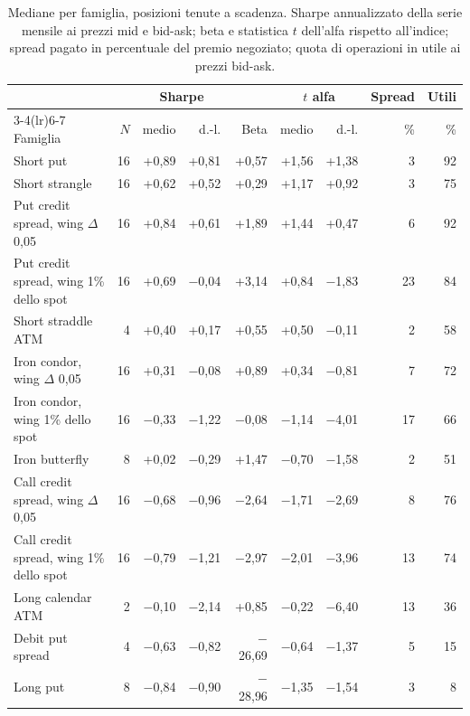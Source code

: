 \documentclass[11pt,a4paper]{article}
\begin{document}
\begin{table}[ht]\centering\small
\caption{Mediane per famiglia, posizioni tenute a scadenza. Sharpe annualizzato della serie mensile ai prezzi mid e bid-ask; beta e statistica $t$ dell'alfa rispetto all'indice; spread pagato in percentuale del premio negoziato; quota di operazioni in utile ai prezzi bid-ask.}\label{tab:fam}
\begin{tabular}{lrrrrrrrr}\toprule
 & & \multicolumn{2}{c}{Sharpe} & & \multicolumn{2}{c}{$t$ alfa} & Spread & Utili \\ \cmidrule(lr){3-4}\cmidrule(lr){6-7}
Famiglia & $N$ & medio & d.-l. & Beta & medio & d.-l. & \% & \% \\ \midrule
Short put & 16 & +0{,}89 & +0{,}81 & +0{,}57 & +1{,}56 & +1{,}38 & 3 & 92 \\
Short strangle & 16 & +0{,}62 & +0{,}52 & +0{,}29 & +1{,}17 & +0{,}92 & 3 & 75 \\
Put credit spread, wing $\Delta$ 0{,}05 & 16 & +0{,}84 & +0{,}61 & +1{,}89 & +1{,}44 & +0{,}47 & 6 & 92 \\
Put credit spread, wing 1\% dello spot & 16 & +0{,}69 & $-$0{,}04 & +3{,}14 & +0{,}84 & $-$1{,}83 & 23 & 84 \\
Short straddle ATM & 4 & +0{,}40 & +0{,}17 & +0{,}55 & +0{,}50 & $-$0{,}11 & 2 & 58 \\
Iron condor, wing $\Delta$ 0{,}05 & 16 & +0{,}31 & $-$0{,}08 & +0{,}89 & +0{,}34 & $-$0{,}81 & 7 & 72 \\
Iron condor, wing 1\% dello spot & 16 & $-$0{,}33 & $-$1{,}22 & $-$0{,}08 & $-$1{,}14 & $-$4{,}01 & 17 & 66 \\
Iron butterfly & 8 & +0{,}02 & $-$0{,}29 & +1{,}47 & $-$0{,}70 & $-$1{,}58 & 2 & 51 \\
Call credit spread, wing $\Delta$ 0{,}05 & 16 & $-$0{,}68 & $-$0{,}96 & $-$2{,}64 & $-$1{,}71 & $-$2{,}69 & 8 & 76 \\
Call credit spread, wing 1\% dello spot & 16 & $-$0{,}79 & $-$1{,}21 & $-$2{,}97 & $-$2{,}01 & $-$3{,}96 & 13 & 74 \\
Long calendar ATM & 2 & $-$0{,}10 & $-$2{,}14 & +0{,}85 & $-$0{,}22 & $-$6{,}40 & 13 & 36 \\
Debit put spread & 4 & $-$0{,}63 & $-$0{,}82 & $-$26{,}69 & $-$0{,}64 & $-$1{,}37 & 5 & 15 \\
Long put & 8 & $-$0{,}84 & $-$0{,}90 & $-$28{,}96 & $-$1{,}35 & $-$1{,}54 & 3 & 8 \\
\bottomrule\end{tabular}\end{table}
\end{document}
